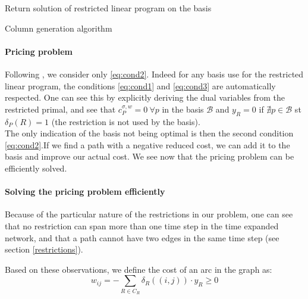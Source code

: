 \documentclass[14pt,a4paper]{article}
\theoremstyle{definition}
\numberwithin{equation}{subsection}
\begin{document}
\begin{algorithm}[H]
	\SetAlgoLined


	Return solution of restricted linear program on the basis\;
	
	
	\caption{Column generation algorithm}
\end{algorithm}






\paragraph{Pricing problem}
\label{pricing}

Following \cite[p.~669]{networkflows}, we consider only \eqref{eq:cond2}. Indeed for any basis use for the restricted linear program, the conditions \eqref{eq:cond1} and \eqref{eq:cond3} are automatically respected. One can see this by explicitly deriving the dual variables from the restricted primal, and see that $c_P^{\sigma,w} = 0 ~\forall p$ in the basis $\mathcal{B}$ and $y_R = 0$  if $\nexists p \in \mathcal{B}$ st $\delta_P(R) = 1$ (the restriction is not used by the basis).\\

 The only indication of the basis not being optimal is then the second condition \eqref{eq:cond2}.If we find a path with a negative reduced cost, we can add it to the basis and improve our actual cost. We see now that the pricing problem can be efficiently solved.
 
\newpage
\paragraph{Solving the pricing problem efficiently}
Because of the particular nature of the restrictions in our problem, one can see that no restriction can span more than one time step in the time expanded network, and that a path cannot have two edges in the same time step (see section \ref*{restrictions}). 

Based on these observations, we define the cost of an arc in the graph as:
\begin{equation*}
w_{ij} = -\sum_{R \in C_R} \delta_R((i,j))\cdot y_R \geq 0
\end{equation*}
\end{document}
